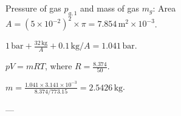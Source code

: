 Pressure of gas \( p_{g,1} \) and mass of gas \( m_g \):  
Area \( A = (5 \times 10^{-2})^2 \times \pi = 7.854 \, \text{m}^2 \times 10^{-3} \).  

\( 1 \, \text{bar} + \frac{32 \, \text{kg}}{A} + 0.1 \, \text{kg} / A = 1.041 \, \text{bar} \).  

\( pV = mRT \), where \( R = \frac{8.374}{50} \).  

\( m = \frac{1.041 \times 3.141 \times 10^{-3}}{8.374 / 773.15} = 2.5426 \, \text{kg} \).  

---